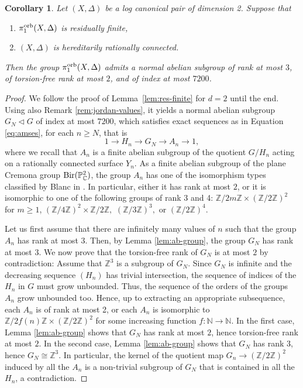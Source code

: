 \documentclass{amsart}
\newcommand{\pp}{\mathbb{P}}
\newcommand{\zz}{\mathbb{Z}}
\newcommand{\nn}{\mathbb{N}}
\newcommand{\cc}{\mathbb{C}}
\newtheorem{corollary}[theorem]{Corollary}
\theoremstyle{definition}
\theoremstyle{remark}
\numberwithin{equation}{section}
\begin{document}
\begin{corollary}\label{cor:res-finite-for-surf}
Let $(X,\Delta)$ be a log canonical pair of dimension 2. Suppose that
\begin{enumerate}
\item $\pi_1^{\rm orb}(X,\Delta)$ is residually finite, 
\item $(X,\Delta)$ is hereditarily rationally connected.
\end{enumerate} 
Then the group $\pi_1^{\rm orb}(X,\Delta)$ admits a normal abelian subgroup of rank at most $3$, of torsion-free rank at most $2$, and of index at most $7200$.
\end{corollary}


\begin{proof}
We follow the proof of Lemma~\ref{lem:res-finite} for $d=2$ until the end. Using also Remark \ref{rem:jordan-values}, it yields a normal abelian subgroup $G_N\triangleleft G$ of index at most $7200$, which satisfies exact sequences as in Equation \eqref{eq:amses}, for each $n\ge N$, that is
$$1\to H_n\to G_N\to A_n\to 1,$$
where we recall that $A_n$ is a finite abelian subgroup of the quotient $G/H_n$ acting on a rationally connected surface $Y_n$. As a finite abelian subgroup of the plane Cremona group ${\rm Bir}(\pp^2_{\cc})$, the group $A_n$ has one of the isomorphism types classified by Blanc in \cite[Theorem 6]{Bla07}. In particular, either it has rank at most $2$, or it is isomorphic to one of the following groups of rank 3 and 4:
$\zz/2m\zz\times (\zz/2\zz)^2$ for $m\ge 1$, $(\zz/4\zz)^2\times \zz/2\zz,$ $(\zz/3\zz)^3,$ or $(\zz/2\zz)^4$. 

Let us first assume that there are infinitely many values of $n$ such that the group $A_n$ has rank at most $3$.
Then, by Lemma \ref{lem:ab-group}, the group $G_N$ has rank at most $3$. We now prove that the torsion-free rank of $G_N$ is at most $2$ by contradiction: Assume that $\zz^3$ is a subgroup of $G_N$. Since $G_N$ is infinite and the decreasing sequence $(H_n)$ has trivial intersection, the sequence of indices of the $H_n$ in $G$ must grow unbounded. Thus, the sequence of the orders of the groups $A_n$ grow unbounded too. Hence, up to extracting an appropriate subsequence, each $A_n$ is of rank at most 2, or each $A_n$ is isomorphic to $\zz/2f(n)\zz\times (\zz/2\zz)^2$ for some increasing function $f:\nn\to\nn$. In the first case, Lemma \ref{lem:ab-group} shows that $G_N$ has rank at most $2$, hence torsion-free rank at most $2$. In the second case, Lemma \ref{lem:ab-group} shows that $G_N$ has rank $3$, hence $G_N\cong \zz^3$. In particular, the kernel of the quotient map $G_n\to (\zz/2\zz)^2$ induced by all the $A_n$ is a non-trivial subgroup of $G_N$ that is contained in all the $H_n$, a contradiction. 


\end{proof}
\end{document}
